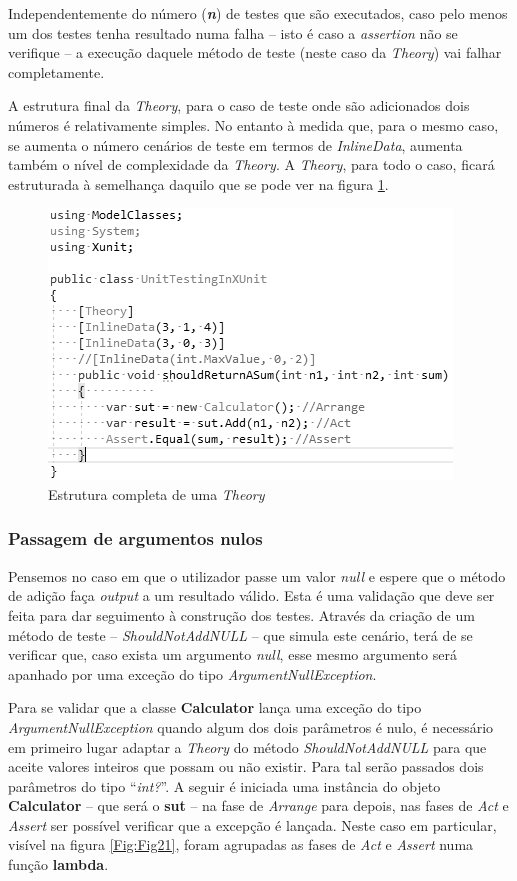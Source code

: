 \hspace{1cm}Independentemente do número (\textbf{\textit{n}}) de testes que são executados, caso pelo menos um dos testes tenha resultado numa falha -- isto é caso a \textit{assertion} não se verifique -- a execução daquele método de teste (neste caso da \textit{Theory}) vai falhar completamente.

\hspace{1cm}A estrutura final da \textit{Theory}, para o caso de teste onde são adicionados dois números é relativamente simples. No entanto à medida que, para o mesmo caso, se aumenta o número cenários de teste em termos de \textit{InlineData}, aumenta também o nível de complexidade da \textit{Theory}. A \textit{Theory}, para todo o caso, ficará estruturada à semelhança daquilo que se pode ver na figura \ref{Fig:Fig20}.

 \begin{figure}[hbt!]
\centering
\includegraphics[width=0.5\linewidth]{Cap5/XUnitTestClassStructure2.png}
\caption{Estrutura completa de uma \textit{Theory}}
\label{Fig:Fig20}
\end{figure}

\subsubsection{Passagem de argumentos nulos}
\hspace{1cm}Pensemos no caso em que o utilizador passe um valor \textit{null} e espere que o método de adição faça \textit{output} a um resultado válido. Esta é uma validação que deve ser feita para dar seguimento à construção dos testes. Através da criação de um método de teste -- \textit{ShouldNotAddNULL} -- que simula este cenário, terá de se verificar que, caso exista um argumento \textit{null}, esse mesmo argumento será apanhado por uma exceção do tipo \textit{ArgumentNullException}.


\hspace{1cm}Para se validar que a classe \textbf{Calculator} lança uma exceção do tipo \textit{ArgumentNullException} quando algum dos dois parâmetros é nulo, é necessário em primeiro lugar adaptar a \textit{Theory} do método \textit{ShouldNotAddNULL} para que aceite valores inteiros que possam ou não existir. Para tal serão passados dois parâmetros do tipo ``\textit{int?}''. A seguir é iniciada uma instância do objeto \textbf{Calculator} -- que será o \textbf{sut} -- na fase de \textit{Arrange} para depois, nas fases de \textit{Act} e \textit{Assert} ser possível verificar que a excepção é lançada. Neste caso em particular, visível na figura \ref{Fig:Fig21}, foram agrupadas as fases de \textit{Act} e \textit{Assert} numa função \textbf{lambda}.

